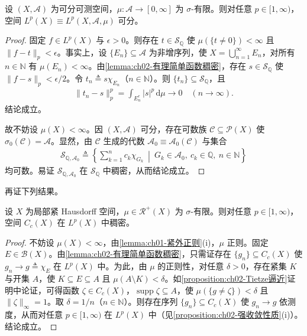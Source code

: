 \documentclass[../../main.tex]{subfiles}%
\begin{document}
\begin{theorem}\label{theorem:ch02-Lp可分}
设 $(X,\mathscr A)$ 为可分可测空间，$\mu:\mathscr A\to[0,\infty]$ 为 $\sigma$-有限。则对任意 $p\in[1,\infty)$，空间 $L^p(X)\equiv L^p(X,\mathscr A,\mu)$ 可分。
\end{theorem}

\begin{proof}
固定 $f\in L^p(X)$ 与 $\epsilon>0$。则存在 $t\in\mathscr S_{\mathbb Q}$ 使 $\mu(\{t\neq0\})<\infty$ 且 $\|f-t\|_p<\epsilon$。事实上，设 $\{E_n\}\subseteq\mathscr A$ 为非增序列，使 $X=\bigcup_{n=1}^\infty E_n$，对所有 $n\in\mathbb N$ 有 $\mu(E_n)<\infty$。由\cref{lemma:ch02-有理简单函数稠密}，存在 $s\in\mathscr S_{\mathbb Q}$ 使 $\|f-s\|_p<\epsilon/2$。令 $t_n\triangleq s\chi_{E_n}$（$n\in\mathbb N$）。则 $\{t_n\}\subseteq\mathscr S_{\mathbb Q}$，且
\begin{align*}
\|t_n-s\|_p^p=\int_{E_n^c}|s|^p\,\mathrm{d}\mu\to0\quad(n\to\infty).
\end{align*}
结论成立。

故不妨设 $\mu(X)<\infty$。因 $(X,\mathscr A)$ 可分，存在可数族 $\mathscr C\subseteq\mathscr P(X)$ 使 $\sigma_0(\mathscr C)=\mathscr A$。显然，由 $\mathscr C$ 生成的代数 $\mathscr A_0\equiv\mathscr A_0(\mathscr C)$ 与集合
\begin{align*}
\mathscr S_{\mathbb Q,\mathscr A_0}\triangleq \left\{\sum_{k=1}^n c_k\chi_{G_k}\ \middle|\ G_k\in\mathscr A_0,\ c_k\in\mathbb Q,\ n\in\mathbb N\right\}
\end{align*}
均可数。易证 $\mathscr S_{\mathbb Q,\mathscr A_0}$ 在 $\mathscr S_{\mathbb Q}$ 中稠密，从而结论成立。
\end{proof}

再证下列结果。

\begin{lemma}\label{lemma:ch02-Cc稠密}
\label{lemma:ch02-稠密逼近}
设 $X$ 为局部紧 Hausdorff 空间，$\mu\in\mathscr R^+(X)$ 为 $\sigma$-有限。则对任意 $p\in[1,\infty)$，空间 $C_c(X)$ 在 $L^p(X)$ 中稠密。
\end{lemma}

\begin{proof}
不妨设 $\mu(X)<\infty$，由\cref{lemma:ch01-紧外正则}(i)，$\mu$ 正则。固定 $E\in\mathscr B(X)$。由\cref{lemma:ch02-有理简单函数稠密}，只需证存在 $\{g_n\}\subseteq C_c(X)$ 使 $g_n\to g\triangleq \chi_E$ 在 $L^p(X)$ 中。为此，由 $\mu$ 的正则性，对任意 $\delta>0$，存在紧集 $K$ 与开集 $A$，使 $K\subseteq E\subseteq A$ 且 $\mu(A\setminus K)<\delta$。如\cref{proposition:ch02-Tietze逼近}证明中论证，可得函数 $\zeta\in C_c(X)$，$\operatorname{supp}\zeta\subseteq A$，使 $\mu(\{g\neq\zeta\})<\delta$ 且 $\|\zeta\|_\infty=1$。取 $\delta=1/n$（$n\in\mathbb N$）。则存在序列 $\{g_n\}\subseteq C_c(X)$ 使 $g_n\to g$ 依测度，从而对任意 $p\in[1,\infty)$ 在 $L^p(X)$ 中（见\cref{proposition:ch02-强收敛性质}(i)）。结论成立。
\end{proof}
\end{document}
